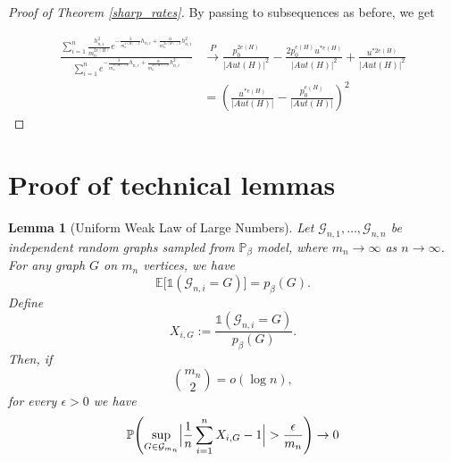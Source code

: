 \documentclass[12pt]{article}
\numberwithin{equation}{section}
\newtheorem{lemma}{Lemma}[section]
\begin{document}
\begin{proof}[Proof of Theorem \ref{sharp_rates}]
By passing to subsequences as before, we get

\begin{align*}\frac{\sum\limits_{i=1}^{n}\frac{h_{n,i}^2}{m_n^{2v(H)}} e^{-\frac{\lambda}{m_n^{v(H)-2}} h_{n,i} + \frac{\alpha}{m_n^{2v(H)-2}}h_{n,i}^2}}{\sum\limits_{i=1}^{n} e^{-\frac{\lambda}{m_n^{v(H)-2}} h_{n,i} + \frac{\alpha}{m_n^{2v(H)-2}}h_{n,i}^2}}&\xrightarrow{P} \frac{p_0^{2e(H)}}{\lvert Aut(H)\rvert^2} - \frac{2p_0^{e(H)}u^{*{e(H)}}}{\lvert Aut(H)\rvert^2} + \frac{u^{*{2e(H)}}}{\lvert Aut(H)\rvert^2}\\
&= \left(\frac{u^{*{e(H)}}}{\lvert Aut(H)\rvert} - \frac{p_0^{e(H)}}{\lvert Aut(H)\rvert}\right)^2
\end{align*}

\end{proof}


\section{Proof of technical lemmas \label{sec:proof_lemmas}}



\begin{lemma}[Uniform Weak Law of Large Numbers]{\label{weak_law}}
Let \(\mathcal{G}_{n,1},\dots, \mathcal{G}_{n,n}\) be independent random graphs sampled from \(\mathbb{P}_{\beta}\) model, where \(m_n\to\infty\) as \(n\to\infty\). For any graph \(G\) on \(m_n\) vertices, we have
\[
\mathbb{E}\bigl[\mathds{1}(\mathcal{G}_{n,i} = G)\bigr] = p_{\beta}(G).
\]
Define
\[
X_{i,G} := \frac{\mathds{1}(\mathcal{G}_{n,i}=G)}{p_{\beta}(G)}.
\]
Then, if
\[
{m_n\choose 2} = o(\log n),
\]
for every \(\epsilon>0\) we have
\[
\mathbb{P}\Biggl(\sup_{G\in \mathcal{G}_{m_n}} \Bigl|\frac{1}{n}\sum_{i=1}^{n} X_{i,G} - 1\Bigr| > \frac{\epsilon}{m_n}\Biggr)
\rightarrow 0
\]

\end{lemma}
\end{document}
